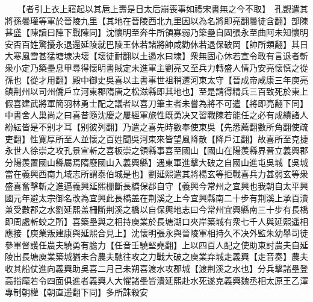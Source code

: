 　　【者引上衣上寤起以其巵上壽是日太后崩喪事如禮宋書無之今不取】　孔覬遣其將孫曇瓘等軍於晉陵九里【其地在晉陵西北九里因以為名將即亮翻曇徒含翻】部陳甚盛【陳讀曰陣下戰陳同】沈懷明至奔牛所領寡弱乃築壘自固張永至曲阿未知懷明安否百姓驚擾永退還延陵就巴陵王休若諸將帥咸勸休若退保破岡【帥所類翻】其日大寒風雪甚猛塘埭决壞【壞徒耐翻以土遏水曰埭】衆無固心休若宣令敢有言退者斬衆小定乃築壘息甲尋得懷明書賊定未進軍主劉亮又至兵力轉盛人情乃安亮懷慎之從孫也【從才用翻】殿中御史吳喜以主書事世祖稍遷河東太守【晉成帝咸康三年庾亮鎮荆州以司州僑戶立河東郡隋唐之松滋縣即其地也】至是請得精兵三百致死於東上假喜建武將軍簡羽林勇士配之議者以喜刀筆主者未嘗為將不可遣【將即亮翻下同】中書舍人巢尚之曰喜昔隨沈慶之屢經軍旅性既勇决又習戰陳若能任之必有成績諸人紛紜皆是不别才耳【别彼列翻】乃遣之喜先時數奉使東吳【先悉薦翻數所角翻使疏吏翻】性寛厚所至人並懷之百姓聞吳河東來皆望風降散【降戶江翻】故喜所至克捷永世人徐崇之攻孔景宣斬之喜板崇之領縣事喜至國山【國山在陽羨縣界晉立義興郡分陽羨置國山縣屬焉隋廢國山入義興縣】遇東軍進擊大破之自國山進屯吳城【吳城當在義興西南九域志所謂泰伯城是也】劉延熙遣其將楊玄等拒戰喜兵力甚弱玄等衆盛喜奮擊斬之進逼義興延熙栅斷長橋保郡自守【義興今常州之宜興也我朝自太平興國元年避太宗御名改為宜興此長橋盖在荆溪之上今宜興縣南二十步有荆溪上承百瀆兼受數郡之水劉延熙盖柵斷荆溪之橋以自保輿地志曰今常州宜興縣南三十步有長橋即周處斬蛟之所】喜築壘與之相持庾業於長塘湖口夾岸築城有衆七千人與延熙遥相應接【庾業叛建康與延熙合見上】沈懷明張永與晉陵軍相持久不决外監朱幼舉司徒參軍督護任農夫驍勇有膽力【任音壬驍堅堯翻】上以四百人配之使助東討農夫自延陵出長塘庾業築城猶未合農夫馳往攻之力戰大破之庾業弃城走義興【走音奏】農夫收其船仗進向義興助吳喜二月己未朔喜渡水攻郡城【渡荆溪之水也】分兵擊諸壘登高指麾若令四面俱進者義興人大懼諸壘皆潰延熙赴水死遂克義興魏丞相太原王乙渾專制朝權【朝直遥翻下同】多所誅殺安

